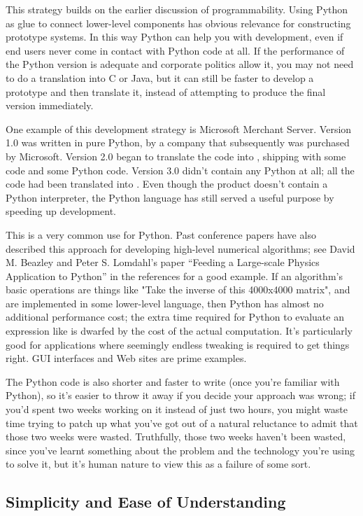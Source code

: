 \documentclass{howto}
\begin{document}
This strategy builds on the earlier discussion of programmability.
Using Python as glue to connect lower-level components has obvious
relevance for constructing prototype systems.  In this way Python can
help you with development, even if end users never come in contact
with Python code at all.  If the performance of the Python version is
adequate and corporate politics allow it, you may not need to do a
translation into C or Java, but it can still be faster to develop a
prototype and then translate it, instead of attempting to produce the
final version immediately.

One example of this development strategy is Microsoft Merchant Server.
Version 1.0 was written in pure Python, by a company that subsequently
was purchased by Microsoft.  Version 2.0 began to translate the code
into \Cpp, shipping with some \Cpp code and some Python code.  Version
3.0 didn't contain any Python at all; all the code had been translated
into \Cpp.  Even though the product doesn't contain a Python
interpreter, the Python language has still served a useful purpose by
speeding up development.  

This is a very common use for Python.  Past conference papers have
also described this approach for developing high-level numerical
algorithms; see David M. Beazley and Peter S. Lomdahl's paper
``Feeding a Large-scale Physics Application to Python'' in the
references for a good example.  If an algorithm's basic operations are
things like "Take the inverse of this 4000x4000 matrix", and are
implemented in some lower-level language, then Python has almost no
additional performance cost; the extra time required for Python to
evaluate an expression like  is dwarfed by the cost
of the actual computation.  It's particularly good for applications
where seemingly endless tweaking is required to get things right. GUI
interfaces and Web sites are prime examples.

The Python code is also shorter and faster to write (once you're
familiar with Python), so it's easier to throw it away if you decide
your approach was wrong; if you'd spent two weeks working on it
instead of just two hours, you might waste time trying to patch up
what you've got out of a natural reluctance to admit that those two
weeks were wasted.  Truthfully, those two weeks haven't been wasted,
since you've learnt something about the problem and the technology
you're using to solve it, but it's human nature to view this as a
failure of some sort.

 \subsection{Simplicity and Ease of Understanding}
\end{document}
